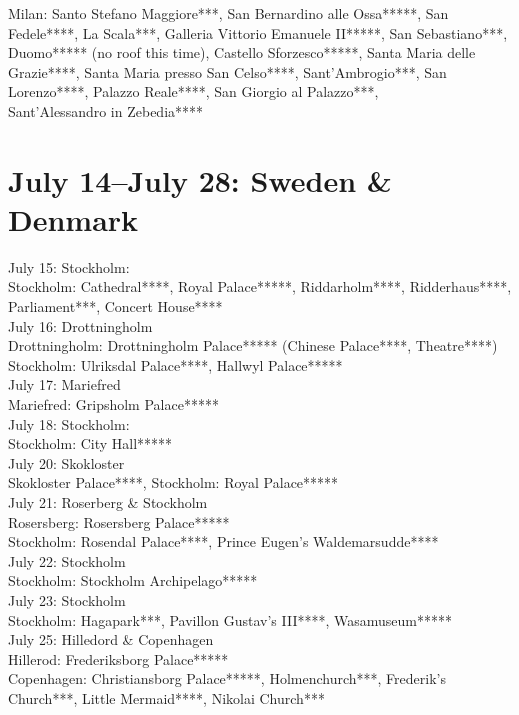 Milan: Santo Stefano Maggiore***, San Bernardino alle Ossa*****, San Fedele****, La Scala***, Galleria Vittorio Emanuele II*****, San Sebastiano***, Duomo***** (no roof this time), Castello Sforzesco*****, Santa Maria delle Grazie****, Santa Maria presso San Celso****, Sant'Ambrogio***, San Lorenzo****, Palazzo Reale****, San Giorgio al Palazzo***,\\ Sant'Alessandro in Zebedia****

\section{July 14--July 28: Sweden \& Denmark}
\label{2013:SwedenDenmark}

July 15: Stockholm:\\
Stockholm: Cathedral****, Royal Palace*****, Riddarholm****, Ridderhaus****, Parliament***, Concert House****\\

July 16: Drottningholm\\
Drottningholm: Drottningholm Palace***** (Chinese Palace****, Theatre****)\\
Stockholm: Ulriksdal Palace****, Hallwyl Palace*****\\

July 17: Mariefred\\
Mariefred: Gripsholm Palace*****\\

July 18: Stockholm:\\
Stockholm: City Hall*****\\

July 20: Skokloster\\
Skokloster Palace****, Stockholm: Royal Palace*****\\

July 21: Roserberg \& Stockholm\\
Rosersberg: Rosersberg Palace*****\\
Stockholm: Rosendal Palace****, Prince Eugen's Waldemarsudde****\\

July 22: Stockholm\\
Stockholm: Stockholm Archipelago*****\\

July 23: Stockholm\\
Stockholm: Hagapark***, Pavillon Gustav's III****, Wasamuseum*****\\

July 25: Hilledord \& Copenhagen\\
Hillerod: Frederiksborg Palace*****\\
Copenhagen: Christiansborg Palace*****, Holmenchurch***, Frederik's Church***, Little Mermaid****, Nikolai Church***\\

